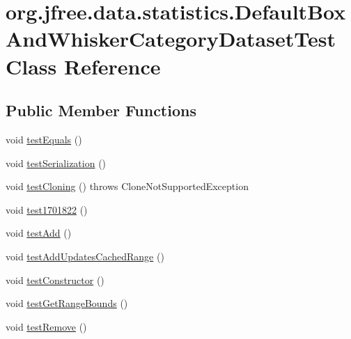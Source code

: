 \hypertarget{classorg_1_1jfree_1_1data_1_1statistics_1_1_default_box_and_whisker_category_dataset_test}{}\section{org.\+jfree.\+data.\+statistics.\+Default\+Box\+And\+Whisker\+Category\+Dataset\+Test Class Reference}
\label{classorg_1_1jfree_1_1data_1_1statistics_1_1_default_box_and_whisker_category_dataset_test}
\subsection*{Public Member Functions}
\begin{DoxyCompactItemize}
\item 
void \mbox{\hyperlink{classorg_1_1jfree_1_1data_1_1statistics_1_1_default_box_and_whisker_category_dataset_test_a414249b1ce4cb97e3c119fa84e788921}{test\+Equals}} ()
\item 
void \mbox{\hyperlink{classorg_1_1jfree_1_1data_1_1statistics_1_1_default_box_and_whisker_category_dataset_test_ac94214e34adcbf54a15cd53a58971d4c}{test\+Serialization}} ()
\item 
void \mbox{\hyperlink{classorg_1_1jfree_1_1data_1_1statistics_1_1_default_box_and_whisker_category_dataset_test_a91a6ba954056cf3b830babbbf0da3928}{test\+Cloning}} ()  throws Clone\+Not\+Supported\+Exception 
\item 
void \mbox{\hyperlink{classorg_1_1jfree_1_1data_1_1statistics_1_1_default_box_and_whisker_category_dataset_test_a881243e551e513ec4fccef9865ae7116}{test1701822}} ()
\item 
void \mbox{\hyperlink{classorg_1_1jfree_1_1data_1_1statistics_1_1_default_box_and_whisker_category_dataset_test_aa4fa783139c44516f03771d91fd71268}{test\+Add}} ()
\item 
void \mbox{\hyperlink{classorg_1_1jfree_1_1data_1_1statistics_1_1_default_box_and_whisker_category_dataset_test_a1a8a2f4d71fd95ac00c8f6769265feed}{test\+Add\+Updates\+Cached\+Range}} ()
\item 
void \mbox{\hyperlink{classorg_1_1jfree_1_1data_1_1statistics_1_1_default_box_and_whisker_category_dataset_test_a47d9957ad482dd435f39ad74d1ca0fde}{test\+Constructor}} ()
\item 
void \mbox{\hyperlink{classorg_1_1jfree_1_1data_1_1statistics_1_1_default_box_and_whisker_category_dataset_test_ac5a0fc1bd794e5aaed8d95d534a52b0b}{test\+Get\+Range\+Bounds}} ()
\item 
void \mbox{\hyperlink{classorg_1_1jfree_1_1data_1_1statistics_1_1_default_box_and_whisker_category_dataset_test_a66713ff8c16d98be4d18495f66e1d7cc}{test\+Remove}} ()
\end{DoxyCompactItemize}


